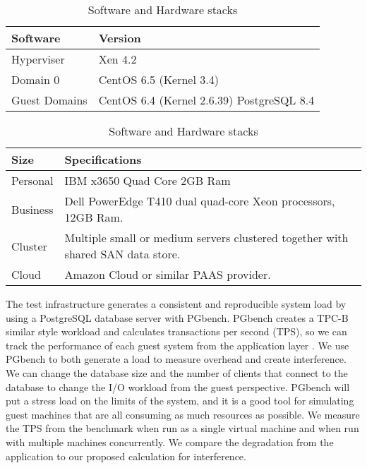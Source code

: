 \begin{table}[h]
\begin{subtable}[h]{0.45\textwidth}
\begin{tabular}{ l p{4.5cm} }
  Software & Version \\
  \hline
  Hyperviser & Xen 4.2 \\
  Domain 0 & CentOS 6.5 (Kernel 3.4) \\
  Guest Domains & CentOS 6.4 (Kernel 2.6.39) PostgreSQL 8.4 \\
  \hline
\end{tabular}
\caption{Software installed virtualization test stack}
\label{softStack}
\end{subtable}
\hfill
\begin{subtable}[h]{0.45\textwidth}
\begin{tabular}{ l p{4.5cm} }
  Size & Specifications \\
  \hline
  Personal & IBM x3650 Quad Core 2GB Ram \\
  Business & Dell PowerEdge T410 dual quad-core Xeon processors, 12GB Ram. \\
  Cluster & Multiple small or medium servers clustered together with shared SAN data store. \\
  Cloud & Amazon Cloud or similar PAAS provider. \\
  \hline
\end{tabular}
\caption{Virtualization sizes for tests}
\label{virtSize}
\end{subtable}
\caption{Software and Hardware stacks}
\end{table}

The test infrastructure generates a consistent and reproducible system load by using a PostgreSQL database server with PGbench.  
 PGbench creates a TPC-B similar style workload and calculates transactions per second (TPS), so we can track the performance of each guest system from the application layer \cite{pgTune}.  
 We use PGbench to both generate a load to measure overhead and create interference.  
 We can change the database size and the number of clients that connect to the database to change the I/O workload from the guest perspective.
PGbench will put a stress load on the limits of the system, and it is a good tool for simulating guest machines that are all consuming as much resources as possible.  
 We measure the TPS from the benchmark when run as a single virtual machine and when run with multiple machines concurrently.  We compare the degradation from the application to our proposed calculation for interference.

